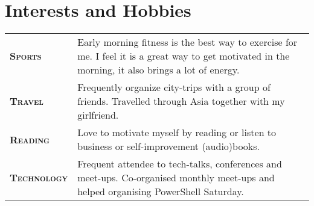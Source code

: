 
\section{Interests and Hobbies}

\begin{tabularx}{0.97\linewidth}{>{\raggedleft\scshape}p{2.5cm}X}
\textbf{Sports} & Early morning fitness is the best way to exercise for me. I feel it is a great way to get motivated in the morning, it also brings a lot of energy.\\
\textbf{Travel} & Frequently organize city-trips with a group of friends. Travelled through Asia together with my girlfriend.\\
\textbf{Reading} & Love to motivate myself by reading or listen to business or self-improvement (audio)books. \\
\textbf{Technology} & Frequent attendee to tech-talks, conferences and meet-ups. Co-organised monthly meet-ups and helped organising PowerShell Saturday.
\end{tabularx}
